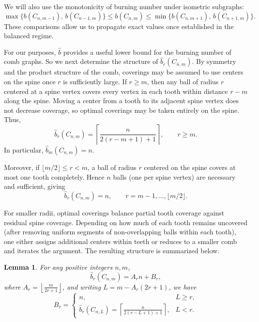 \documentclass{article}
\def\floor#1{{\lfloor #1 \rfloor}}
\newtheorem{lemma}{Lemma}
\begin{document}
We will also use the monotonicity of burning number under isometric subgraphs:
\begin{equation}\label{eq: monotonicity b}
\max\{b(C_{n,m-1}),\, b(C_{n-1,m})\}
\le b(C_{n,m})
\le
\min\{b(C_{n,m+1}),\, b(C_{n+1,m})\}.
\end{equation}
These comparisons allow us to propagate exact values once established in the balanced regime.

For our purposes, $\hat b$ provides a useful lower bound for the burning number of comb graphs. So we  next determine the structure of $\hat b_r(C_{n,m})$. By symmetry and the product structure of the comb, coverings may be assumed to use centers on the spine once $r$ is sufficiently large. If $r \ge m$, then any ball of radius $r$ centered at a spine vertex covers every vertex in each tooth within distance $r-m$ along the spine. Moving a center from a tooth to its adjacent spine vertex does not decrease coverage, so optimal coverings may be taken entirely on the spine. Thus,
\begin{equation}\label{eq:hatb_r_ge_m}
    \hat b_r(C_{n,m})
    =
    \left\lceil 
    \frac{n}{2(r-m+1)+1}
    \right\rceil,
    \qquad r \ge m.
\end{equation}
In particular, $\hat b_m(C_{n,m}) = n$.

Moreover, if $\floor{m/2}\le r < m$, a ball of radius $r$ centered on the spine covers at most one tooth completely. Hence $n$ balls (one per spine vertex) are necessary and sufficient, giving
\begin{equation}\label{eq:hatb_r_le_m}
    \hat b_r(C_{n,m}) = n,
    \qquad r = m-1,\ldots,\lfloor m/2\rfloor.
\end{equation}

For smaller radii, optimal coverings balance partial tooth coverage against residual spine coverage. Depending on how much of each tooth remains uncovered (after removing uniform segments of non-overlapping balls within each tooth), one either assigns additional centers within teeth or reduces to a smaller comb and iterates the argument. The resulting structure is summarized below.



\begin{lemma}\label{l: hat br}
For any positive integers $n,m$,
\[
\hat b_r(C_{n,m}) = A_r n + B_r,
\]
where $\displaystyle A_r=\left\lfloor \frac{m}{2r+1}\right\rfloor$, and writing $L=m-A_r(2r+1)$, we have
\[
B_r=
\begin{cases}
n, & L\ge r,\\[4pt]
\hat b_r(C_{n,L})
   =\displaystyle\left\lceil \frac{n}{2(r-L+1)+1}\right\rceil,
   & L<r.
\end{cases}
\]
\end{lemma}
\end{document}
